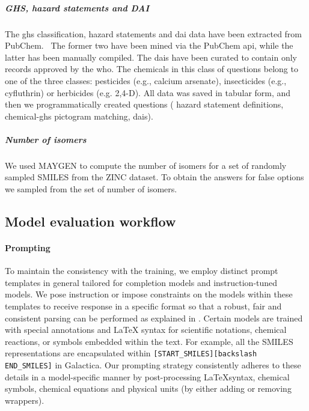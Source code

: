 \documentclass[11pt, oneside]{article}
\begin{document}
\subparagraph{GHS, hazard statements and DAI}
The \gls{ghs} classification, hazard statements and \gls{dai} data have been extracted from PubChem.~\cite{pubchem}
The former two have been mined via the PubChem \gls{api}, while the latter has been manually compiled.
The \glspl{dai} have been curated to contain only records approved by the \gls{who}.
The chemicals in this class of questions belong to one of the three classes: pesticides (e.g., calcium arsenate), insecticides (e.g., cyfluthrin) or herbicides (e.g. 2,4-D).
All data was saved in tabular form, and then we programmatically created questions ( hazard statement definitions,  chemical-\gls{ghs} pictogram matching,  \glspl{dai}).


\subparagraph{Number of isomers}
We used MAYGEN\cite{Yirik_2021} to compute the number of isomers for a set of randomly sampled SMILES from the ZINC dataset.
To obtain the answers for false options we sampled from the set of number of isomers.

\subsection{Model evaluation workflow}

\paragraph{Prompting}

To maintain the consistency with the training, we employ distinct prompt templates in general tailored for completion models and instruction-tuned models. 
We pose instruction or impose constraints on the models within these templates to receive response in a specific format so that a robust, fair and consistent parsing can be performed as explained in .
Certain models are trained with special annotations and LaTeX syntax for scientific notations, chemical reactions, or symbols embedded within the text. 
For example, all the SMILES representations are encapsulated within \texttt{[START\_SMILES][\text backslash END\_SMILES]} in Galactica\cite{taylor2022galactica}.
Our prompting strategy consistently adheres to  these details in a model-specific manner by post-processing \LaTeX syntax, chemical symbols, chemical equations and physical units (by either adding or removing wrappers).
\end{document}
